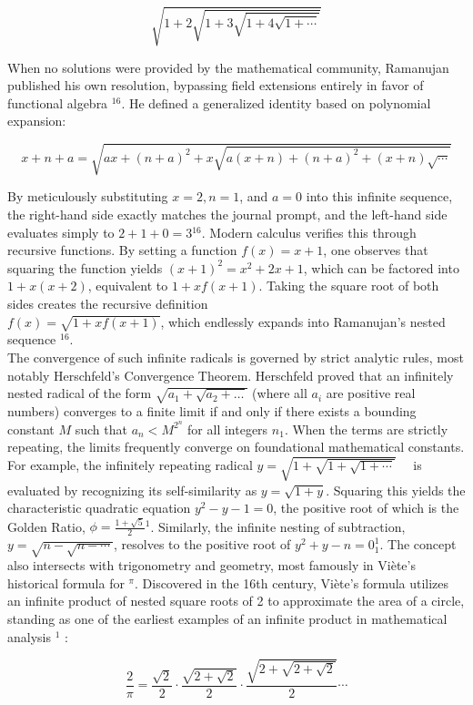 \documentclass[10pt]{article}
\begin{document}
$$
\sqrt{1+2 \sqrt{1+3 \sqrt{1+4 \sqrt{1+\cdots}}}}
$$

When no solutions were provided by the mathematical community, Ramanujan published his own resolution, bypassing field extensions entirely in favor of functional algebra ${ }^{16}$. He defined a generalized identity based on polynomial expansion:

$$
x+n+a=\sqrt{a x+(n+a)^{2}+x \sqrt{a(x+n)+(n+a)^{2}+(x+n) \sqrt{\cdots}}}
$$

By meticulously substituting $x=2, n=1$, and $a=0$ into this infinite sequence, the right-hand side exactly matches the journal prompt, and the left-hand side evaluates simply to $2+1+0=3{ }^{16}$. Modern calculus verifies this through recursive functions. By setting a function $f(x)=x+1$, one observes that squaring the function yields $(x+1)^{2}=x^{2}+2 x+1$, which can be factored into $1+x(x+2)$, equivalent to $1+x f(x+1)$. Taking the square root of both sides creates the recursive definition\\
$f(x)=\sqrt{1+x f(x+1)}$, which endlessly expands into Ramanujan's nested sequence ${ }^{16}$.\\
The convergence of such infinite radicals is governed by strict analytic rules, most notably Herschfeld's Convergence Theorem. Herschfeld proved that an infinitely nested radical of the form $\sqrt{a_{1}+\sqrt{a_{2}+\ldots}}$ (where all $a_{i}$ are positive real numbers) converges to a finite limit if and only if there exists a bounding constant $M$ such that $a_{n}<M^{2^{n}}$ for all integers $n_{1}$. When the terms are strictly repeating, the limits frequently converge on foundational mathematical constants. For example, the infinitely repeating radical $y=\sqrt{1+\sqrt{1+\sqrt{1+\cdots}}} \quad$ is evaluated by recognizing its self-similarity as $y=\sqrt{1+y}$. Squaring this yields the characteristic quadratic equation $y^{2}-y-1=0$, the positive root of which is the Golden Ratio, $\phi=\frac{1+\sqrt{5}}{2}{ }^{1}$. Similarly, the infinite nesting of subtraction, $y=\sqrt{n-\sqrt{n-\cdots}}$, resolves to the positive root of $y^{2}+y-n=0_{1}^{1}$. The concept also intersects with trigonometry and geometry, most famously in Viète's historical formula for ${ }^{\pi}$. Discovered in the 16th century, Viète's formula utilizes an infinite product of nested square roots of 2 to approximate the area of a circle, standing as one of the earliest examples of an infinite product in mathematical analysis ${ }^{1}$ :

$$
\frac{2}{\pi}=\frac{\sqrt{2}}{2} \cdot \frac{\sqrt{2+\sqrt{2}}}{2} \cdot \frac{\sqrt{2+\sqrt{2+\sqrt{2}}}}{2} \cdots
$$
\end{document}
